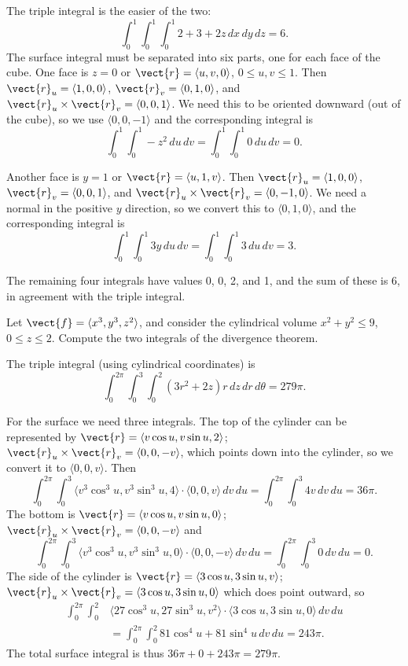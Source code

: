 \begin{solution}
The triple integral is the easier of the two:
$$\int_0^1\int_0^1\int_0^1 2+3+2z\,dx\,dy\,dz=6.$$
The surface integral must be separated into six parts, one for each
face of the cube. One face is $z=0$ or $\vect{r}=\langle u,v,0\rangle$, $0\le
u,v\le 1$. Then $\vect{r}_u=\langle 1,0,0\rangle$, 
$\vect{r}_v=\langle 0,1,0\rangle$, and $\vect{r}_u\times\vect{r}_v=
\langle 0,0,1\rangle$. We need this to be oriented downward (out of
the cube), so we use
$\langle 0,0,-1\rangle$ and the corresponding integral is
$$\int_0^1\int_0^1 -z^2\,du\,dv=\int_0^1\int_0^1 0\,du\,dv=0.$$

Another face is $y=1$ or $\vect{r}=\langle u,1,v\rangle$. Then $\vect{r}_u=\langle 1,0,0\rangle$, $\vect{r}_v=\langle 0,0,1\rangle$, and
$\vect{r}_u\times\vect{r}_v= \langle 0,-1,0\rangle$. We need a normal in
the positive $y$ direction, so we convert this to $\langle
0,1,0\rangle$, and the corresponding integral is
$$\int_0^1\int_0^1 3y\,du\,dv=\int_0^1\int_0^1 3\,du\,dv=3.$$

The remaining four integrals have values 0, 0, 2, and 1, and the sum
of these is 6, in agreement with the triple integral.
\end{solution}

\begin{example}{}{}
Let $\vect{f}=\langle x^3,y^3,z^2\rangle$, and consider the
cylindrical volume $x^2+y^2\le9$, $0\le z\le2$.
Compute the two integrals of the divergence theorem.
\end{example}

\begin{solution}
The triple integral (using cylindrical coordinates) is 
$$\int_0^{2\pi}\int_0^3\int_0^2 (3r^2+2z)r\,dz\,dr\,d\theta=279\pi.$$

For the surface we need three integrals. The top of the cylinder can
be represented by
$\vect{r}=\langle v\cos u,v\sin u,2\rangle$; 
$\vect{r}_u\times\vect{r}_v=\langle 0,0,-v\rangle$, which points down
into the cylinder,
so we convert it to $\langle 0,0,v\rangle$. Then
$$\int_0^{2\pi}\int_0^3 \langle v^3\cos^3u,v^3\sin^3u,4\rangle\cdot
\langle 0,0,v\rangle\,dv\,du=
\int_0^{2\pi}\int_0^3 4v\,dv\,du=36\pi.$$
The bottom is 
$\vect{r}=\langle v\cos u,v\sin u,0\rangle$; 
$\vect{r}_u\times\vect{r}_v=\langle 0,0,-v\rangle$ and
$$\int_0^{2\pi}\int_0^3 \langle v^3\cos^3u,v^3\sin^3u,0\rangle\cdot
\langle 0,0,-v\rangle\,dv\,du=
\int_0^{2\pi}\int_0^3 0\,dv\,du=0.$$
The side of the cylinder is $\vect{r}=\langle 3\cos u,3\sin u,v\rangle$;
$\vect{r}_u\times\vect{r}_v=\langle 3\cos u,3\sin u,0\rangle$ which does
point outward, so
\begin{align*}
\int_0^{2\pi}\int_0^2 &\langle 27\cos^3 u,27\sin^3 u,v^2\rangle\cdot
\langle 3\cos u,3\sin u,0\rangle \,dv\,du	\\
&=\int_0^{2\pi}\int_0^2 81\cos^4 u+81\sin^4u\,dv\,du=243\pi.
\end{align*}
The total surface integral is thus $36\pi+0+243\pi=279\pi$.
\end{solution}



